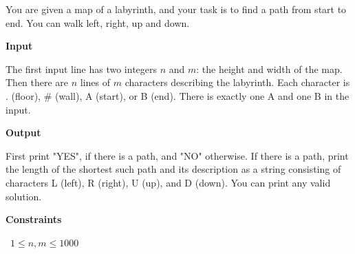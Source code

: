 You are given a map of a labyrinth, and your task is to find a path from start to end. You can walk left, right, up and down.

\vspace{0.3cm}\noindent\textbf{Input}

The first input line has two integers $n$ and $m$: the height and width of the map.
Then there are $n$ lines of $m$ characters describing the labyrinth. Each character is . (floor), \# (wall), A (start), or B (end). There is exactly one A and one B in the input.

\vspace{0.3cm}\noindent\textbf{Output}

First print "YES", if there is a path, and "NO" otherwise.
If there is a path, print the length of the shortest such path and its description as a string consisting of characters L (left), R (right), U (up), and D (down). You can print any valid solution.

\vspace{0.3cm}\noindent\textbf{Constraints}

\textbullet\ $1 \le n,m \le 1000$